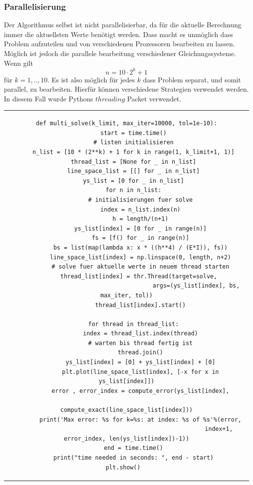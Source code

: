 \documentclass[12pt,titlepage]{article}
\begin{document}
		\subsubsection{Parallelisierung}
			Der Algorithmus selbst ist nicht parallelisierbar, da für die aktuelle Berechnung immer die aktuellsten Werte benötigt werden. Dass macht es unmöglich dass Problem aufzuteilen und von verschiedenen Prozessoren bearbeiten zu lassen. Möglich ist jedoch die parallele bearbeitung verschiedener Gleichungssysteme. Wenn gilt
			\begin{equation*}
				n = 10 \cdot 2^k +1
			\end{equation*}
			für $k=1,..,10$. Es ist also möglich für jedes $k$ dass Problem separat, und somit parallel, zu bearbeiten.
			Hierfür können verschiedene Strategien verwendet werden. In diesem Fall wurde Pythons $threading$ Packet verwendet.\newline \newline
			\begin{tabular}{c}
			\begin{lstlisting}
def multi_solve(k_limit, max_iter=10000, tol=1e-10):
	start = time.time()
	# listen initialisieren
    n_list = [10 * (2**k) + 1 for k in range(1, k_limit+1, 1)]
    thread_list = [None for _ in n_list]
    line_space_list = [[] for _ in n_list]
    ys_list = [0 for _ in n_list]
    for n in n_list:
    	# initialisierungen fuer solve
    	index = n_list.index(n)
        h = length/(n+1)
        ys_list[index] = [0 for _ in range(n)]
        fs = [f() for _ in range(n)]
        bs = list(map(lambda x: x * ((h**4) / (E*I)), fs))
        line_space_list[index] = np.linspace(0, length, n+2)
        # solve fuer aktuelle werte in neuem thread starten
        thread_list[index] = thr.Thread(target=solve, 
        								args=(ys_list[index], bs, max_iter, tol))
        thread_list[index].start()

    for thread in thread_list:
        index = thread_list.index(thread)
        # warten bis thread fertig ist
        thread.join()
        ys_list[index] = [0] + ys_list[index] + [0]
        plt.plot(line_space_list[index], [-x for x in ys_list[index]])
        error , error_index = compute_error(ys_list[index],
         													compute_exact(line_space_list[index]))
       	print('Max error: %s for k=%s: at index: %s of %s'%(error,
       												 index+1, error_index, len(ys_list[index])-1))
	end = time.time()
    print("time needed in seconds: ", end - start)
    plt.show()		
	 	\end{lstlisting}
		\end{tabular}
\end{document}
